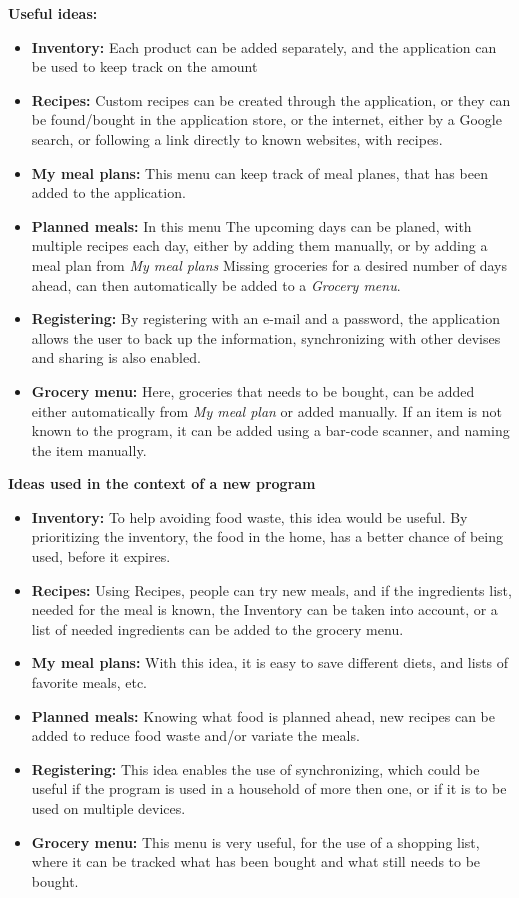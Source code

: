 \textbf{Useful ideas:}
\begin{itemize}
  \item \textbf{Inventory:} Each product can be added separately, and the application can be used to keep track on the amount
  \item \textbf{Recipes:} Custom recipes can be created through the application, or they can be found/bought in the application store, or the internet, either by a Google search, or following a link directly to known websites, with recipes.
  \item \textbf{My meal plans:} This menu can keep track of meal planes, that has been added to the application.
  \item \textbf{Planned meals:} In this menu The upcoming days can be planed, with multiple recipes each day, either by adding them manually, or by adding a meal plan from \textit{My meal plans} Missing groceries for a desired  number of days ahead, can then automatically be added to a \textit{Grocery menu}.
  \item \textbf{Registering:} By registering with an e-mail and a password, the application allows the user to back up the information, synchronizing with other devises and sharing is also enabled.
  \item \textbf{Grocery menu:} Here, groceries that needs to be bought, can be added either automatically from \textit{My meal plan} or added manually. If an item is not known to the program, it can be added using a bar-code scanner, and naming the item manually.
\end{itemize}

\textbf{Ideas used in the context of a new program}
\begin{itemize}
  \item \textbf{Inventory:} To help avoiding food waste, this idea would be useful. By prioritizing the inventory, the food in the home, has a better chance of being used, before it expires.
  \item \textbf{Recipes:} Using Recipes, people can try new meals, and if the ingredients list, needed for the meal is known, the Inventory can be taken into account, or a list of needed ingredients can be added to the grocery menu.
  \item \textbf{My meal plans:} With this idea, it is easy to save different diets, and lists of favorite meals, etc.
  \item \textbf{Planned meals:} Knowing what food is planned ahead, new recipes can be added to reduce food waste and/or variate the meals.
  \item \textbf{Registering:} This idea enables the use of synchronizing, which could be useful if the program is used in a household of more then one, or if it is to be used on multiple devices.
  \item \textbf{Grocery menu:} This menu is very useful, for the use of a shopping list, where it can be tracked what has been bought and what still needs to be bought.
\end{itemize}


